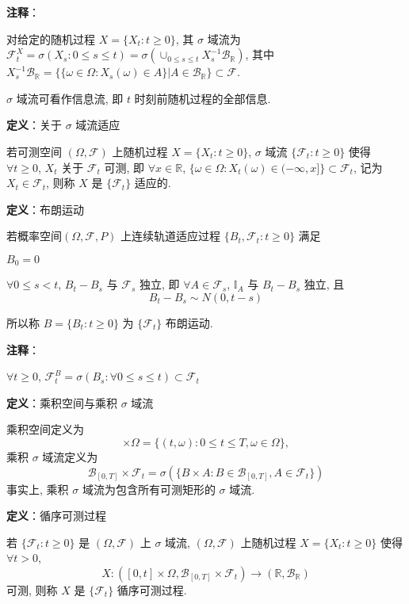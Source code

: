 \documentclass[openany]{ctexbook}
\theoremstyle{kaiti}
\theoremstyle{normal}
\begin{document}
\textbf{注释}：

对给定的随机过程 $X=\{X_t:t\geqslant0\}$, 其 $\sigma$ 域流为 $\mathcal{F}_t^X=\sigma(X_s:0\leqslant s\leqslant t)=\sigma(\cup_{0\leqslant s\leqslant t}X_s^{-1}\mathcal{B}_{\mathbb{R}})$, 其中 $X_s^{-1}\mathcal{B}_{\mathbb{R}}=\{\{\omega\in\Omega:X_s(\omega)\in A\}|A\in\mathcal{B}_{\mathbb{R}}\}\subset\mathcal{F}$.

$\sigma$ 域流可看作信息流, 即 $t$ 时刻前随机过程的全部信息.

\textbf{定义}：关于 $\sigma$ 域流适应

若可测空间 $(\Omega,\mathcal{F})$ 上随机过程 $X=\{X_t:t\geqslant0\}$, $\sigma$ 域流 $\{\mathcal{F}_t:t\geqslant0\}$ 使得 $\forall t\geqslant0$, $X_t$ 关于 $\mathcal{F}_t$ 可测, 即 $\forall x\in\mathbb{R}$, $\{\omega\in\Omega:X_t(\omega)\in(-\infty,x]\}\subset\mathcal{F}_t$, 记为 $X_t\in\mathcal{F}_t$, 则称 $X$ 是 $\{\mathcal{F}_t\}$ 适应的.

\textbf{定义}：布朗运动

若概率空间$(\Omega,\mathcal{F},P)$ 上连续轨道适应过程 $\{B_t,\mathcal{F}_t:t\geqslant0\}$ 满足

$B_0=0$

$\forall0\leqslant s<t$, $B_t-B_s$ 与 $\mathcal{F}_s$ 独立, 即 $\forall A\in\mathcal{F}_s$, $\mathbb{I}_A$ 与 $B_t-B_s$ 独立, 且
\begin{equation}
  B_t-B_s\sim N(0,t-s)
\end{equation}

所以称 $B=\{B_t:t\geqslant0\}$ 为 $\{\mathcal{F}_t\}$ 布朗运动. 

\textbf{注释}：

$\forall t\geqslant0$, $\mathcal{F}_t^B=\sigma(B_s:\forall0\leqslant s\leqslant t)\subset\mathcal{F}_t$

\textbf{定义}：乘积空间与乘积 $\sigma$ 域流

乘积空间定义为
\begin{equation}
  [0,T]\times\Omega=\{(t,\omega):0\leqslant t\leqslant T,\omega\in\Omega\},
\end{equation}
 乘积 $\sigma$ 域流定义为
\begin{equation}
  \mathcal{B}_{[0,T]}\times\mathcal{F}_t=\sigma(\{B\times A:B\in\mathcal{B}_{[0,T]},A\in\mathcal{F}_t\})
\end{equation}
 事实上, 乘积 $\sigma$ 域流为包含所有可测矩形的 $\sigma$ 域流.

\textbf{定义}：循序可测过程

若 $\{\mathcal{F}_t:t\geqslant0\}$ 是 $(\Omega,\mathcal{F})$ 上 $\sigma$ 域流, $(\Omega,\mathcal{F})$ 上随机过程 $X=\{X_t:t\geqslant0\}$ 使得 $\forall t>0$,
\begin{equation}
  X:([0,t]\times\Omega,\mathcal{B}_{[0,T]}\times\mathcal{F}_t)\to(\mathbb{R},\mathcal{B}_{\mathbb{R}})
\end{equation}
 可测, 则称 $X$ 是 $\{\mathcal{F}_t\}$ 循序可测过程.
\end{document}

